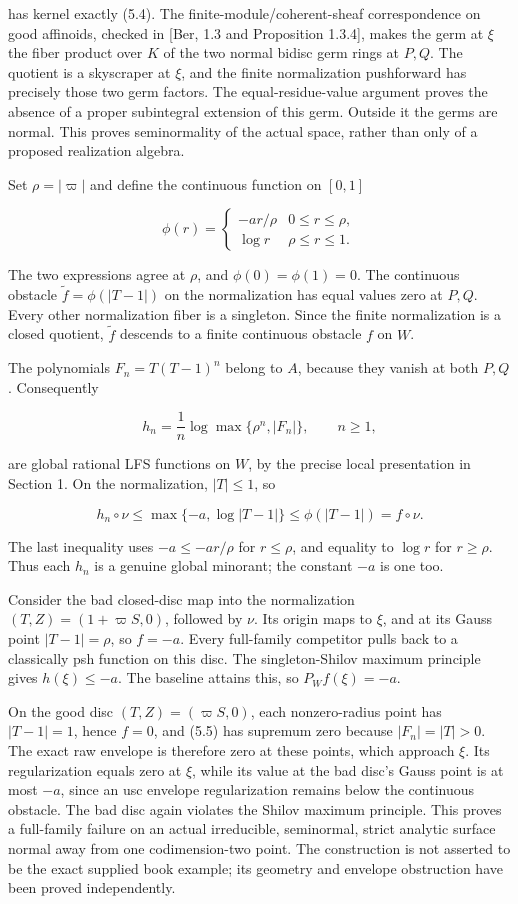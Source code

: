 \documentclass[11pt,a4paper]{article}
\begin{document}
has kernel exactly (5.4). The finite-module/coherent-sheaf correspondence on good affinoids, checked in [Ber, 1.3 and Proposition 1.3.4], makes the germ at \(\xi\) the fiber product over \(K\) of the two normal bidisc germ rings at \(P,Q\). The quotient is a skyscraper at \(\xi\), and the finite normalization pushforward has precisely those two germ factors. The equal-residue-value argument proves the absence of a proper subintegral extension of this germ. Outside it the germs are normal. This proves seminormality of the actual space, rather than only of a proposed realization algebra.

Set \(\rho=|\varpi|\) and define the continuous function on \([0,1]\)

\[
\phi(r)=
\begin{cases}
-a r/\rho&0\leq r\leq\rho,\\
\log r&\rho\leq r\leq1.
\end{cases}
\]

The two expressions agree at \(\rho\), and \(\phi(0)=\phi(1)=0\). The continuous obstacle \(\widetilde f=\phi(|T-1|)\) on the normalization has equal values zero at \(P,Q\). Every other normalization fiber is a singleton. Since the finite normalization is a closed quotient, \(\widetilde f\) descends to a finite continuous obstacle \(f\) on \(W\).

The polynomials \(F_n=T(T-1)^n\) belong to \(A\), because they vanish at both \(P,Q\). Consequently

\[
h_n=\frac1n\log\max\{\rho^n,|F_n|\},\qquad n\geq1, \tag{5.5}
\]

are global rational LFS functions on \(W\), by the precise local presentation in Section 1. On the normalization, \(|T|\leq1\), so

\[
h_n\circ\nu\leq\max\{-a,\log|T-1|\}
\leq\phi(|T-1|)=f\circ\nu.
\]

The last inequality uses \(-a\leq-a r/\rho\) for \(r\leq\rho\), and equality to \(\log r\) for \(r\geq\rho\). Thus each \(h_n\) is a genuine global minorant; the constant \(-a\) is one too.

Consider the bad closed-disc map into the normalization \((T,Z)=(1+\varpi S,0)\), followed by \(\nu\). Its origin maps to \(\xi\), and at its Gauss point \(|T-1|=\rho\), so \(f=-a\). Every full-family competitor pulls back to a classically psh function on this disc. The singleton-Shilov maximum principle gives \(h(\xi)\leq-a\). The baseline attains this, so \(P_Wf(\xi)=-a\).

On the good disc \((T,Z)=(\varpi S,0)\), each nonzero-radius point has \(|T-1|=1\), hence \(f=0\), and (5.5) has supremum zero because \(|F_n|=|T|>0\). The exact raw envelope is therefore zero at these points, which approach \(\xi\). Its regularization equals zero at \(\xi\), while its value at the bad disc's Gauss point is at most \(-a\), since an usc envelope regularization remains below the continuous obstacle. The bad disc again violates the Shilov maximum principle. This proves a full-family failure on an actual irreducible, seminormal, strict analytic surface normal away from one codimension-two point. The construction is not asserted to be the exact supplied book example; its geometry and envelope obstruction have been proved independently.
\end{document}
